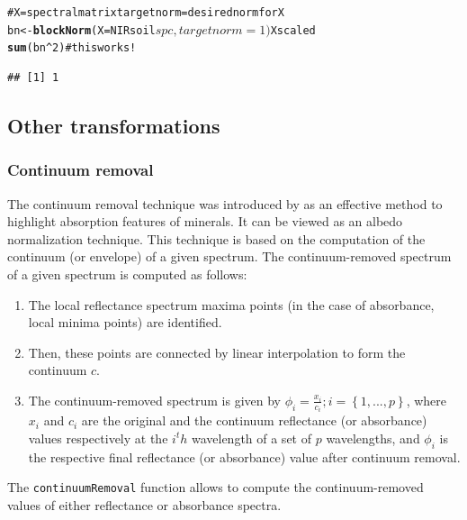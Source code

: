 \documentclass[12pt]{article}\usepackage{graphicx, color}
\makeatletter
\newcommand{\hlfunctioncall}[1]{\textcolor[rgb]{0.501960784313725,0,0.329411764705882}{\textbf{#1}}}%
\newcommand{\hlcomment}[1]{\textcolor[rgb]{0.180392156862745,0.6,0.341176470588235}{#1}}%
\newenvironment{kframe}{%
 \def\at@end@of@kframe{}%
 \ifinner\ifhmode%
  \def\at@end@of@kframe{\end{minipage}}%
  \begin{minipage}{\columnwidth}%
 \fi\fi%
 \def\FrameCommand##1{\hskip\@totalleftmargin \hskip-\fboxsep
 \colorbox{shadecolor}{##1}\hskip-\fboxsep
     \hskip-\linewidth \hskip-\@totalleftmargin \hskip\columnwidth}%
 \MakeFramed {\advance\hsize-\width
   \@totalleftmargin\z@ \linewidth\hsize
   \@setminipage}}%
 {\par\unskip\endMakeFramed%
 \at@end@of@kframe}
\newenvironment{knitrout}{}{} %
\newcommand{\Rfunction}[1]{{\texttt{#1}}}
\makeatother
\begin{document}
\begin{knitrout}
\color{fgcolor}\begin{kframe}
\begin{alltt}
\hlcomment{# X = spectral matrix targetnorm = desired norm for X}
bn <- \hlfunctioncall{blockNorm}(X = NIRsoil$spc, targetnorm = 1)$Xscaled
\hlfunctioncall{sum}(bn^2)  \hlcomment{# this works!}
\end{alltt}
\begin{verbatim}
## [1] 1
\end{verbatim}
\end{kframe}
\end{knitrout}


\subsection{Other transformations}

\subsubsection{Continuum removal}    

The continuum removal technique was introduced by \cite{clark1984} as an effective method to highlight absorption features of minerals. It can be viewed as an albedo normalization technique. This technique is based on the computation of the continuum (or envelope) of a given spectrum. The continuum-removed spectrum of a given spectrum is computed as follows:
\begin{enumerate}
  \item The local reflectance spectrum maxima points (in the case of absorbance, local minima points) are identified.  
  \item Then, these points are connected by linear interpolation to form the continuum $c$. 
  \item The continuum-removed spectrum is given by $\phi_{i} = \frac{x_{i}}{c_{i}};  i=\left \{ 1,..., p\right\}$, where $x_{i}$ and $c_{i}$ are the original and the continuum reflectance (or absorbance) values respectively at the $i^th$ wavelength of a set of $p$ wavelengths, and $\phi_{i}$ is the respective final reflectance (or absorbance) value after continuum removal.
\end{enumerate}

The \Rfunction{continuumRemoval} function allows to compute the continuum-removed values of either reflectance or absorbance spectra. 
\end{document}

